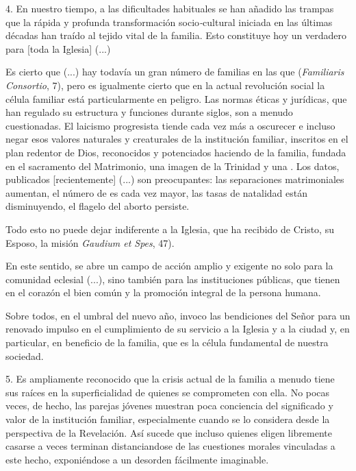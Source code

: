 \begin{body}
\begin{body}
		4. En nuestro tiempo, a las dificultades habituales se han añadido las trampas que la rápida y profunda transformación socio\emph{-}cultural iniciada en las últimas décadas han traído al tejido vital de la familia. Esto constituye hoy un verdadero  para {[}toda la Iglesia{]} (...)
		
		Es cierto que (...) hay todavía un gran número de familias en las que  (\emph{Familiaris Consortio}, 7), pero es igualmente cierto que en la actual revolución social la célula familiar está particularmente en peligro. Las normas éticas y jurídicas, que han regulado su estructura y funciones durante siglos, son a menudo cuestionadas. El laicismo progresista tiende cada vez más a oscurecer e incluso negar esos valores naturales y creaturales de la institución familiar, inscritos en el plan redentor de Dios, reconocidos y potenciados haciendo de la familia, fundada en el sacramento del Matrimonio, una imagen de la Trinidad y una . Los datos, publicados {[}recientemente{]} (...) son preocupantes: las separaciones matrimoniales aumentan, el número de  es cada vez mayor, las tasas de natalidad están disminuyendo, el flagelo del aborto persiste.
		
		Todo esto no puede dejar indiferente a la Iglesia, que ha recibido de Cristo, su Esposo, la misión  \emph{Gaudium et Spes}, 47).
		
		En este sentido, se abre un campo de acción amplio y exigente no solo para la comunidad eclesial (...), sino también para las instituciones públicas, que tienen en el corazón el bien común y la promoción integral de la persona humana.
		
		Sobre todos, en el umbral del nuevo año, invoco las bendiciones del Señor para un renovado impulso en el cumplimiento de su servicio a la Iglesia y a la ciudad y, en particular, en beneficio de la familia, que es la célula fundamental de nuestra sociedad.
		
		5. Es ampliamente reconocido que la crisis actual de la familia a menudo tiene sus raíces en la superficialidad de quienes se comprometen con ella. No pocas veces, de hecho, las parejas jóvenes muestran poca conciencia del significado y valor de la institución familiar, especialmente cuando se lo considera desde la perspectiva de la Revelación. Así sucede que incluso quienes eligen libremente casarse  a veces terminan distanciandose de las cuestiones morales vinculadas a este hecho, exponiéndose a un desorden fácilmente imaginable.
		

\end{body}
\end{body}
